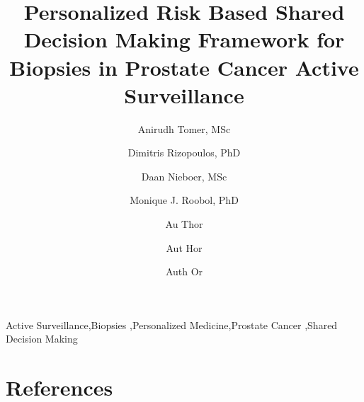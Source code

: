 \documentclass[review, 12pt]{elsarticle}
\begin{document}
\begin{frontmatter}

\title{Personalized Risk Based Shared Decision Making Framework for Biopsies in Prostate Cancer Active Surveillance}

\author[1]{Anirudh Tomer, MSc} 

\author[1]{Dimitris Rizopoulos, PhD}

\author[2]{Daan Nieboer, MSc}

\author[3]{Monique J. Roobol, PhD}

\author[4]{Au Thor}
\author[4]{Aut Hor}
\author[4]{Auth Or}

\address[1]{Department of Biostatistics, Erasmus University Medical Center, Rotterdam, the Netherlands}
\address[2]{Department of Public Health, Erasmus University Medical Center, Rotterdam, the Netherlands}
\address[3]{Department of Urology, Erasmus University Medical Center, Rotterdam, the Netherlands}
\address[4]{Department of xxxx, xxxx University Medical Center, City, Country}




\begin{keyword}
Active Surveillance\sep Biopsies \sep Personalized Medicine\sep Prostate Cancer \sep Shared Decision Making
\end{keyword}

\end{frontmatter}

\linenumbers








\section*{References}


\end{document}

